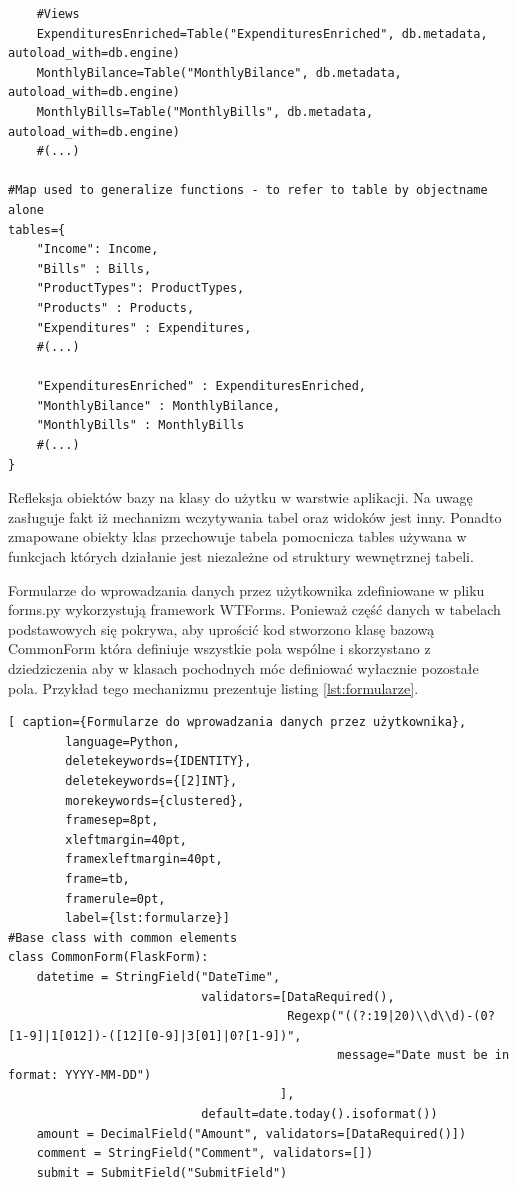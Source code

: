 \documentclass[a4paper,10pt, twoside]{report}
\begin{document}
\begin{large}
\begin{minipage}{\textwidth}
\begin{lstlisting}
    #Views
    ExpendituresEnriched=Table("ExpendituresEnriched", db.metadata, autoload_with=db.engine)
    MonthlyBilance=Table("MonthlyBilance", db.metadata, autoload_with=db.engine)
    MonthlyBills=Table("MonthlyBills", db.metadata, autoload_with=db.engine)
    #(...)

#Map used to generalize functions - to refer to table by objectname alone
tables={
    "Income": Income,
    "Bills" : Bills,
    "ProductTypes": ProductTypes,
    "Products" : Products,
    "Expenditures" : Expenditures,
    #(...)

    "ExpendituresEnriched" : ExpendituresEnriched,
    "MonthlyBilance" : MonthlyBilance,
    "MonthlyBills" : MonthlyBills
    #(...)
}\end{lstlisting}
{Refleksja obiektów bazy na klasy do użytku w warstwie aplikacji. Na uwagę 
zasługuje fakt iż mechanizm wczytywania tabel oraz widoków jest inny. Ponadto 
zmapowane obiekty klas przechowuje tabela pomocnicza tables używana w funkcjach 
których działanie jest niezależne od struktury wewnętrznej tabeli.}
\end{minipage}

{Formularze do wprowadzania danych przez użytkownika zdefiniowane w pliku 
forms.py wykorzystują framework WTForms. Ponieważ część danych w tabelach 
podstawowych się pokrywa, aby uprościć kod stworzono klasę bazową CommonForm 
która definiuje wszystkie pola wspólne i skorzystano z dziedziczenia aby w 
klasach pochodnych móc definiować wyłacznie pozostałe pola. Przykład tego 
mechanizmu prezentuje listing \ref*{lst:formularze}.}

\begin{minipage}{\textwidth}
    \begin{lstlisting}[ caption={Formularze do wprowadzania danych przez użytkownika},
        language=Python,
        deletekeywords={IDENTITY},
        deletekeywords={[2]INT},
        morekeywords={clustered},
        framesep=8pt,
        xleftmargin=40pt,
        framexleftmargin=40pt,
        frame=tb,
        framerule=0pt,
        label={lst:formularze}]
#Base class with common elements
class CommonForm(FlaskForm):
    datetime = StringField("DateTime", 
                           validators=[DataRequired(),
                                       Regexp("((?:19|20)\\d\\d)-(0?[1-9]|1[012])-([12][0-9]|3[01]|0?[1-9])", 
                                              message="Date must be in format: YYYY-MM-DD")
                                      ],
                           default=date.today().isoformat())
    amount = DecimalField("Amount", validators=[DataRequired()])
    comment = StringField("Comment", validators=[])
    submit = SubmitField("SubmitField")


\end{lstlisting}
\end{minipage}
\end{large}
\end{document}

